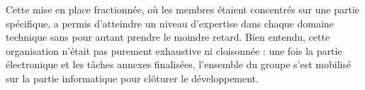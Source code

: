 Cette mise en place fractionnée, où les membres étaient concentrés sur une partie spécifique, a permis d'atteindre un niveau d'expertise dans chaque domaine technique sans pour autant prendre le moindre retard. Bien entendu, cette organisation n'était pas purement exhaustive ni cloisonnée : une fois la partie électronique et les tâches annexes finalisées, l'ensemble du groupe s'est mobilisé sur la partie informatique pour clôturer le développement.
